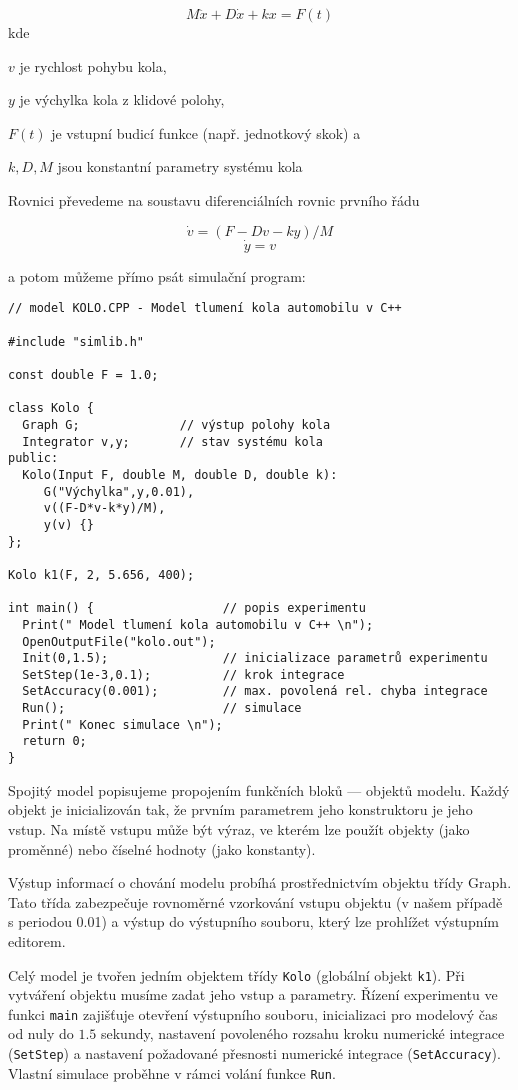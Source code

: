 \documentclass[a4paper]{article}
\begin{document}
           $$ M \ddot{x} + D \dot{x} + k x = F(t) $$
\noindent
kde

 $v$      je rychlost pohybu kola,

 $y$      je výchylka kola z klidové polohy,

 $F(t)$   je vstupní budicí funkce (např. jednotkový skok) a

 $k,D,M$  jsou konstantní parametry systému kola

\noindent
Rovnici převedeme na soustavu diferenciálních rovnic prvního řádu

           $$ \dot{v} = (F - D v - k y) / M $$
           $$ \dot{y} = v $$

a potom můžeme přímo psát simulační program:

{\small
\begin{verbatim}
// model KOLO.CPP - Model tlumení kola automobilu v C++

#include "simlib.h"

const double F = 1.0;

class Kolo {
  Graph G;              // výstup polohy kola
  Integrator v,y;       // stav systému kola
public:
  Kolo(Input F, double M, double D, double k):
     G("Výchylka",y,0.01),
     v((F-D*v-k*y)/M),
     y(v) {}
};

Kolo k1(F, 2, 5.656, 400);

int main() {                  // popis experimentu
  Print(" Model tlumení kola automobilu v C++ \n");
  OpenOutputFile("kolo.out");
  Init(0,1.5);                // inicializace parametrů experimentu
  SetStep(1e-3,0.1);          // krok integrace
  SetAccuracy(0.001);         // max. povolená rel. chyba integrace
  Run();                      // simulace
  Print(" Konec simulace \n");
  return 0;
}
\end{verbatim}
}

Spojitý model popisujeme propojením funkčních bloků --- objektů
modelu. Každý objekt je inicializován tak, že prvním parametrem
jeho konstruktoru je jeho vstup. Na místě vstupu může být výraz,
ve kterém lze použít objekty (jako proměnné) nebo číselné
hodnoty (jako konstanty).

Výstup informací o chování modelu probíhá prostřednictvím
objektu třídy Graph. Tato třída zabezpečuje rovnoměrné
vzorkování vstupu objektu (v našem případě s periodou 0.01)
a výstup do výstupního souboru, který lze prohlížet výstupním
editorem.

Celý model je tvořen jedním objektem třídy \verb|Kolo| (globální objekt
\verb|k1|). Při vytváření objektu musíme zadat jeho vstup a parametry. Řízení
experimentu ve funkci \verb|main| zajišťuje otevření výstupního souboru,
inicializaci pro modelový čas od nuly do $1.5$ sekundy, nastavení povoleného
rozsahu kroku numerické integrace (\verb|SetStep|) a nastavení požadované
přesnosti numerické integrace (\verb|SetAccuracy|). Vlastní simulace proběhne
v rámci volání funkce \verb|Run|.
\end{document}

